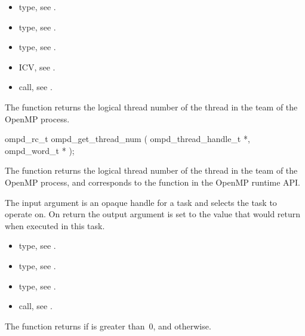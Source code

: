 \crossreferences
\begin{itemize}
  \item {} type, see .
	\item {} type, see .
	\item {} type, see .
	\item {} ICV, see .
	\item {} call, see .
\end{itemize}

\label{subsubsubsec:ompd_get_thread_num}
\summary
The  function returns the logical thread number of the thread in the team of the OpenMP process.

\format
\begin{cspecific}
\begin{ompSyntax}
ompd_rc_t ompd_get_thread_num (
  ompd_thread_handle_t *,
  ompd_word_t *
);
\end{ompSyntax}
\end{cspecific}

\descr
The  function returns the logical thread number of the thread in the team of the OpenMP process, and
corresponds to the  function in the OpenMP runtime API.


\argdesc
The input argument  is an opaque handle for a task and selects the task to operate on.
On return the output argument  is set to the value that  would return when
executed in this task.

\crossreferences
\begin{itemize}
  \item {} type, see .
	\item {} type, see .
	\item {} type, see .
	\item {} call, see .
\end{itemize}


\label{subsubsubsec:ompd_in_parallel}
\summary
The  function returns  if  is greater than~0, and  otherwise.

